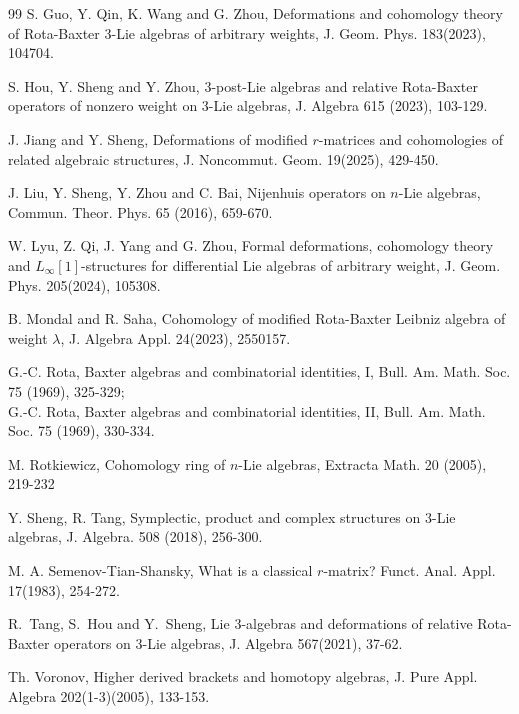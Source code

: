 \documentclass[12pt]{amsart}
\theoremstyle{definition}
\begin{document}
\begin{thebibliography}{99}
 S. Guo, Y. Qin, K. Wang and G. Zhou,  Deformations and cohomology theory of  Rota-Baxter $3$-Lie algebras of arbitrary weights,    J. Geom. Phys.   183(2023), 104704.

  S. Hou,  Y. Sheng and Y. Zhou, $3$-post-Lie algebras and relative Rota-Baxter operators of nonzero weight on $3$-Lie algebras, J.  Algebra  615 (2023), 103-129.


  J. Jiang and Y. Sheng,  Deformations of modified $r$-matrices and cohomologies of related algebraic structures,  J. Noncommut. Geom. 19(2025),  429-450.

    J. Liu, Y. Sheng, Y. Zhou and C. Bai, Nijenhuis operators on $n$-Lie algebras, Commun. Theor. Phys.  65 (2016), 659-670.

  W. Lyu, Z. Qi, J. Yang and G. Zhou, Formal deformations, cohomology theory and $L_\infty[1]$-structures for differential Lie algebras of arbitrary weight, J. Geom. Phys. 205(2024), 105308.

 B. Mondal and R. Saha, Cohomology of modified Rota-Baxter Leibniz algebra of weight $\lambda$, J. Algebra Appl. 24(2023), 2550157.

  G.-C. Rota, Baxter algebras and combinatorial identities, I, Bull. Am. Math. Soc.  75 (1969),  325-329;\\
G.-C. Rota, Baxter algebras and combinatorial identities, II, Bull. Am. Math. Soc.  75 (1969),  330-334.

 M. Rotkiewicz, Cohomology ring of $n$-Lie algebras, Extracta Math. 20 (2005), 219-232

 Y. Sheng, R. Tang,
Symplectic, product and complex structures on 3-Lie algebras,
J. Algebra. 508 (2018), 256-300.


  M. A. Semenov-Tian-Shansky, What is a classical $r$-matrix? Funct. Anal. Appl. 17(1983), 254-272.

  R.~Tang, S.~Hou and  Y.~Sheng,   Lie $3$-algebras and deformations of relative Rota-Baxter  operators on $3$-Lie algebras,  J. Algebra  567(2021), 37-62.

 Th. Voronov, Higher derived brackets and homotopy algebras,  J. Pure Appl. Algebra   202(1-3)(2005),  133-153.


\end{thebibliography}
\end{document}

